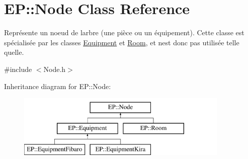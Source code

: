 \hypertarget{class_e_p_1_1_node}{}\section{EP\+:\+:Node Class Reference}
\label{class_e_p_1_1_node}


Représente un noeud de l\textquotesingle{}arbre (une pièce ou un équipement). Cette classe est spécialisée par les classes \hyperlink{class_e_p_1_1_equipment}{Equipment} et \hyperlink{class_e_p_1_1_room}{Room}, et n\textquotesingle{}est donc pas utilisée telle qu\textquotesingle{}elle.  




{\ttfamily \#include $<$Node.\+h$>$}

Inheritance diagram for EP\+:\+:Node\+:\begin{figure}[H]
\begin{center}
\leavevmode
\includegraphics[height=3.000000cm]{class_e_p_1_1_node}
\end{center}
\end{figure}
